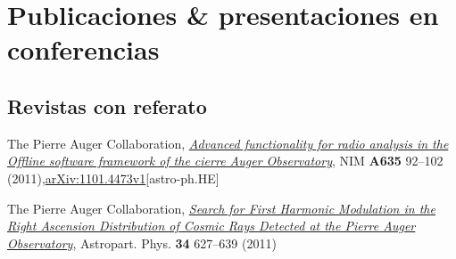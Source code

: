 \documentclass[11pt, a4paper]{article}
\newcommand{\years}[1]{\marginnote{\scriptsize #1}}
\begin{document}
% 
% 
% 

\section*{Publicaciones \& presentaciones en conferencias}

\subsection*{Revistas con referato}
\noindent

\years{2011}The Pierre Auger Collaboration,
\href{http://dx.doi.org/10.1016/j.nima.2011.01.049}{{\emph{Advanced
functionality for radio analysis in the Offline software framework of the
cierre Auger Observatory}}}, NIM {\bf A635} 92--102 (2011),\href{http://arxiv.org/abs/1101.4473}{arXiv:1101.4473v1}[astro-ph.HE]

\years{2011}The Pierre Auger Collaboration, 
\href{http://dx.doi.org/10.1016/j.astropartphys.2010.12.007}{\emph{Search for First Harmonic Modulation in the Right Ascension Distribution of Cosmic Rays Detected at the Pierre Auger Observatory}}, Astropart. Phys. {\bf 34} 627--639 (2011)
\end{document}
